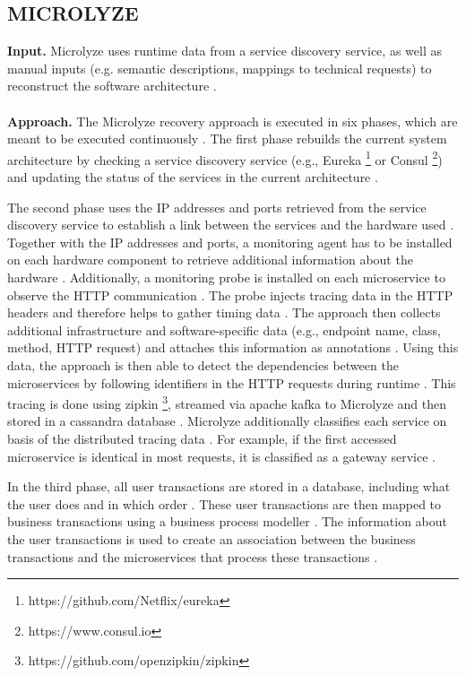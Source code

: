 \subsection{MICROLYZE \cite{Kleehaus2018}}
\label{sec:Results:Microlyze}
\textbf{Input.}
Microlyze uses runtime data from a service discovery service, as well as manual inputs (e.g. semantic descriptions, mappings to technical requests) to reconstruct the software architecture \cite{Kleehaus2018}.
\\ \\
\textbf{Approach.}
The Microlyze recovery approach is executed in six phases, which are meant to be executed continuously \cite{Kleehaus2018}.
The first phase rebuilds the current system architecture by checking a service discovery service (e.g., Eureka \footnote{https://github.com/Netflix/eureka} or Consul \footnote{https://www.consul.io}) and updating the status of the services in the current architecture \cite{Kleehaus2018}.

The second phase uses the IP addresses and ports retrieved from the service discovery service to establish a link between the services and the hardware used \cite{Kleehaus2018}.
Together with the IP addresses and ports, a monitoring agent has to be installed on each hardware component to retrieve additional information about the hardware \cite{Kleehaus2018}.
Additionally, a monitoring probe is installed on each microservice to observe the HTTP communication \cite{Kleehaus2018}.
The probe injects tracing data in the HTTP headers and therefore helps to gather timing data \cite{Kleehaus2018}.
The approach then collects additional infrastructure and software-specific data (e.g., endpoint name, class, method, HTTP request) and attaches this information as annotations \cite{Kleehaus2018}.
Using this data, the approach is then able to detect the dependencies between the microservices by following identifiers in the HTTP requests during runtime \cite{Kleehaus2018}.
This tracing is done using zipkin \footnote{https://github.com/openzipkin/zipkin}, streamed via apache kafka to Microlyze and then stored in a cassandra database \cite{Kleehaus2018}.
Microlyze additionally classifies each service on basis of the distributed tracing data \cite{Kleehaus2018}.
For example, if the first accessed microservice is identical in most requests, it is classified as a gateway service \cite{Kleehaus2018}.

In the third phase, all user transactions are stored in a database, including what the user does and in which order \cite{Kleehaus2018}.
These user transactions are then mapped to business transactions using a business process modeller \cite{Kleehaus2018}.
The information about the user transactions is used to create an association between the business transactions and the microservices that process these transactions \cite{Kleehaus2018}.

